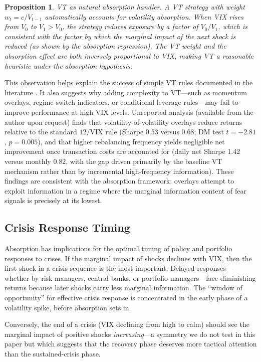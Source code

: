 \documentclass[12pt,a4paper]{article}
\newtheorem{proposition}{Proposition}
\begin{document}
\begin{proposition}
\textit{VT as natural absorption handler.} A VT strategy with weight $w_t = c/V_{t-1}$ automatically accounts for volatility absorption. When VIX rises from $V_0$ to $V_1 > V_0$, the strategy reduces exposure by a factor of $V_0/V_1$, which is consistent with the factor by which the marginal impact of the next shock is reduced (as shown by the absorption regression). The VT weight and the absorption effect are both inversely proportional to VIX, making VT a reasonable heuristic under the absorption hypothesis.
\end{proposition}

This observation helps explain the success of simple VT rules documented in the literature \citep{moreira2017, harvey2018}. It also suggests why adding complexity to VT---such as momentum overlays, regime-switch indicators, or conditional leverage rules---may fail to improve performance at high VIX levels. Unreported analysis (available from the author upon request) finds that volatility-of-volatility overlays reduce returns relative to the standard $12/\text{VIX}$ rule (Sharpe 0.53 versus 0.68; DM test $t = -2.81$, $p = 0.005$), and that higher rebalancing frequency yields negligible net improvement once transaction costs are accounted for (daily net Sharpe 1.42 versus monthly 0.82, with the gap driven primarily by the baseline VT mechanism rather than by incremental high-frequency information). These findings are consistent with the absorption framework: overlays attempt to exploit information in a regime where the marginal information content of fear signals is precisely at its lowest.

\subsection{Crisis Response Timing}

Absorption has implications for the optimal timing of policy and portfolio responses to crises. If the marginal impact of shocks declines with VIX, then the first shock in a crisis sequence is the most important. Delayed responses---whether by risk managers, central banks, or portfolio managers---face diminishing returns because later shocks carry less marginal information. The ``window of opportunity'' for effective crisis response is concentrated in the early phase of a volatility spike, before absorption sets in.

Conversely, the end of a crisis (VIX declining from high to calm) should see the marginal impact of positive shocks \textit{increasing}---a symmetry we do not test in this paper but which suggests that the recovery phase deserves more tactical attention than the sustained-crisis phase.
\end{document}
